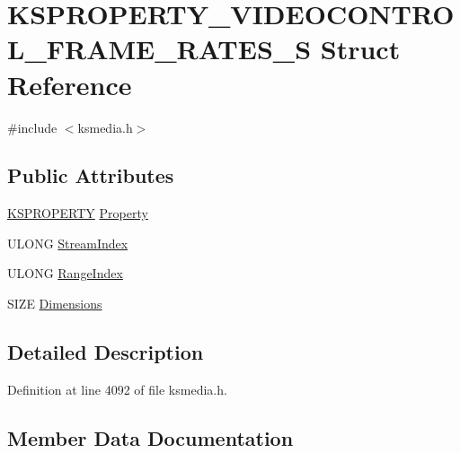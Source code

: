 \hypertarget{struct_k_s_p_r_o_p_e_r_t_y___v_i_d_e_o_c_o_n_t_r_o_l___f_r_a_m_e___r_a_t_e_s___s}{}\section{K\+S\+P\+R\+O\+P\+E\+R\+T\+Y\+\_\+\+V\+I\+D\+E\+O\+C\+O\+N\+T\+R\+O\+L\+\_\+\+F\+R\+A\+M\+E\+\_\+\+R\+A\+T\+E\+S\+\_\+S Struct Reference}
\label{struct_k_s_p_r_o_p_e_r_t_y___v_i_d_e_o_c_o_n_t_r_o_l___f_r_a_m_e___r_a_t_e_s___s}


{\ttfamily \#include $<$ksmedia.\+h$>$}

\subsection*{Public Attributes}
\begin{DoxyCompactItemize}
\item 
\hyperlink{ks_8h_a4392f77c74e868d813d46c39ada4d660}{K\+S\+P\+R\+O\+P\+E\+R\+TY} \hyperlink{struct_k_s_p_r_o_p_e_r_t_y___v_i_d_e_o_c_o_n_t_r_o_l___f_r_a_m_e___r_a_t_e_s___s_a2eb438917504801b1c427a24b24f090f}{Property}
\item 
U\+L\+O\+NG \hyperlink{struct_k_s_p_r_o_p_e_r_t_y___v_i_d_e_o_c_o_n_t_r_o_l___f_r_a_m_e___r_a_t_e_s___s_ac32ada6fed52efad67eabecab3a903ed}{Stream\+Index}
\item 
U\+L\+O\+NG \hyperlink{struct_k_s_p_r_o_p_e_r_t_y___v_i_d_e_o_c_o_n_t_r_o_l___f_r_a_m_e___r_a_t_e_s___s_a7d336e87441be1a6859bdf1197487118}{Range\+Index}
\item 
S\+I\+ZE \hyperlink{struct_k_s_p_r_o_p_e_r_t_y___v_i_d_e_o_c_o_n_t_r_o_l___f_r_a_m_e___r_a_t_e_s___s_a92167a20632f83ee45fa85e756335bea}{Dimensions}
\end{DoxyCompactItemize}


\subsection{Detailed Description}


Definition at line 4092 of file ksmedia.\+h.



\subsection{Member Data Documentation}
